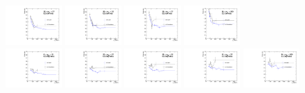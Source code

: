 \begin{figure}[!htbp]
\includegraphics[width=0.19\textwidth]{fig/compare_pv_EE1_2017_23to27.pdf}
\includegraphics[width=0.19\textwidth]{fig/compare_pv_EE1_2017_28to32.pdf}
\includegraphics[width=0.19\textwidth]{fig/compare_pv_EE1_2017_33to37.pdf}
\includegraphics[width=0.19\textwidth]{fig/compare_pv_EE1_2017_38to200.pdf}\\
\includegraphics[width=0.19\textwidth]{fig/compare_pv_EE2_2017_0to22.pdf}
\includegraphics[width=0.19\textwidth]{fig/compare_pv_EE2_2017_23to27.pdf}
\includegraphics[width=0.19\textwidth]{fig/compare_pv_EE2_2017_28to32.pdf}
\includegraphics[width=0.19\textwidth]{fig/compare_pv_EE2_2017_33to37.pdf}
\includegraphics[width=0.19\textwidth]{fig/compare_pv_EE2_2017_38to200.pdf}
\label{fig:frpileup_compare_dataset_2017}
\end{figure}

